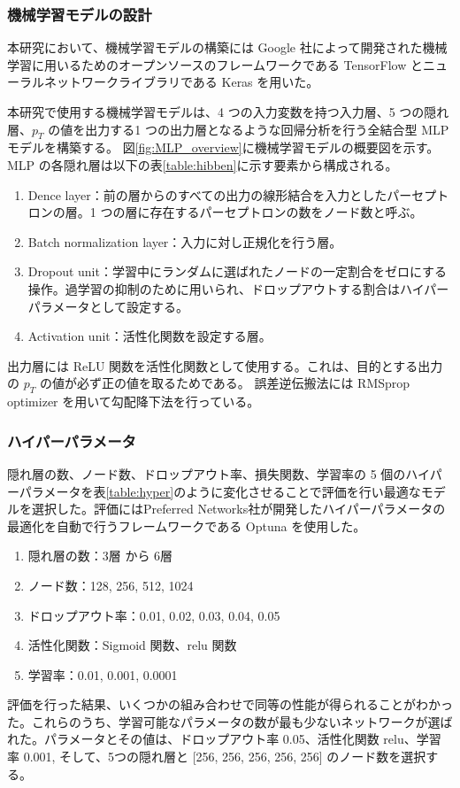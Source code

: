 \subsubsection{機械学習モデルの設計}

本研究において、機械学習モデルの構築には Google 社によって開発された機械学習に用いるためのオープンソースのフレームワークである TensorFlow \cite{article:TensorFlow}とニューラルネットワークライブラリである Keras \cite{article:keras}を用いた。

本研究で使用する機械学習モデルは、4 つの入力変数を持つ入力層、5 つの隠れ層、$p_T$ の値を出力する1 つの出力層となるような回帰分析を行う全結合型 MLP モデルを構築する。
図\ref{fig:MLP_overview}に機械学習モデルの概要図を示す。
MLP の各隠れ層は以下の表\ref{table:hibben}に示す要素から構成される。
\begin{enumerate}\label{table:hibben}
   \item Dence layer：前の層からのすべての出力の線形結合を入力としたパーセプトロンの層。1 つの層に存在するパーセプトロンの数をノード数と呼ぶ。
   \item Batch normalization layer：入力に対し正規化を行う層。
   \item Dropout unit：学習中にランダムに選ばれたノードの一定割合をゼロにする操作。過学習の抑制のために用いられ、ドロップアウトする割合はハイパーパラメータとして設定する。
   \item Activation unit：活性化関数を設定する層。
\end{enumerate}
出力層には ReLU 関数を活性化関数として使用する。これは、目的とする出力の $p_T$ の値が必ず正の値を取るためである。
誤差逆伝搬法には RMSprop optimizer を用いて勾配降下法を行っている。

\subsubsection{ハイパーパラメータ}
隠れ層の数、ノード数、ドロップアウト率、損失関数、学習率の 5 個のハイパーパラメータを表\ref{table:hyper}のように変化させることで評価を行い最適なモデルを選択した。評価にはPreferred Networks社が開発したハイパーパラメータの最適化を自動で行うフレームワークである Optuna \cite{article:optuna}を使用した。
\begin{enumerate}\label{table:hyper}
   \item 隠れ層の数：3層 から 6層
   \item ノード数：128, 256, 512, 1024
   \item ドロップアウト率：0.01, 0.02, 0.03, 0.04, 0.05
   \item 活性化関数：Sigmoid 関数、relu 関数
   \item 学習率：0.01, 0.001, 0.0001
\end{enumerate}
評価を行った結果、いくつかの組み合わせで同等の性能が得られることがわかった。これらのうち、学習可能なパラメータの数が最も少ないネットワークが選ばれた。パラメータとその値は、ドロップアウト率 0.05、活性化関数 relu、学習率 0.001, そして、5つの隠れ層と [256, 256, 256, 256, 256] のノード数を選択する。

